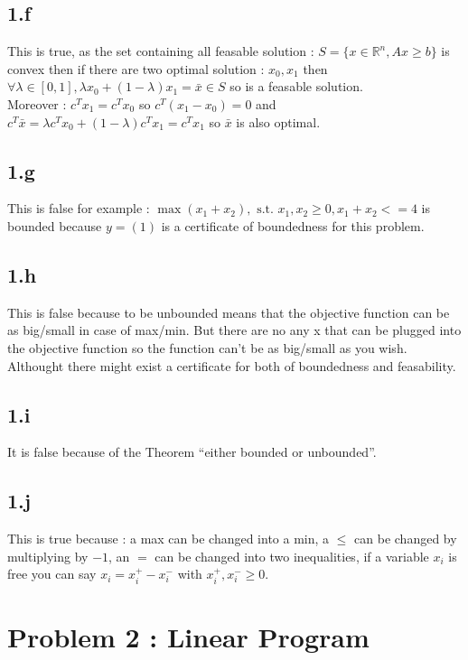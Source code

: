 \documentclass{article}
\begin{document}
\subsection*{1.f}
This is true, as the set containing all feasable solution : $S = \{x\in\mathbb{R}^n, Ax\ge b\}$ is convex then if there are two optimal solution : $x_0,x_1$ then $\forall \lambda\in[0,1], \lambda x_0+(1-\lambda)x_1 = \bar{x}\in S $ so is a feasable solution.
\\
Moreover : $c^Tx_1 = c^Tx_0$ so $c^T(x_1-x_0) = 0$ and $c^T\bar{x} = \lambda c^Tx_0+(1-\lambda)c^Tx_1 = c^Tx_1$ so $\bar{x}$ is also optimal.
\subsection*{1.g}
This is false for example : $\max (x_1+x_2), \text{ s.t. } x_1,x_2\ge 0, x_1+x_2<=4$
 is bounded because $y = (1)$  is a certificate of boundedness for this problem.
\subsection*{1.h}
This is false because to be unbounded means that the objective function can be as big/small in case of max/min.
But there are no any x that can be plugged into the objective function so the function can't be as big/small as you wish.
Althought there might exist a certificate for both of boundedness and feasability.
\subsection*{1.i}
It is false because of the Theorem ``either bounded or unbounded''. 
\subsection*{1.j}
This is true because : a max can be changed into a min,
a $\leq$ can be changed by multiplying by $-1$,
an $=$ can be changed into two inequalities,
if a variable $x_i$ is free you can say $x_i=x_i^+-x_i^-$ with $x_i^+,x_i^-\ge0$.


\section*{Problem 2 : Linear Program}
\end{document}
